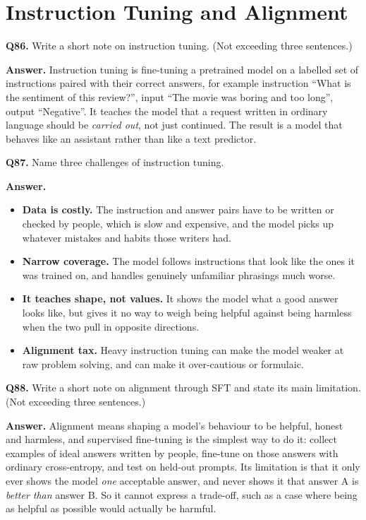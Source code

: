 \documentclass[11pt]{article}
\begin{document}
\section{Instruction Tuning and Alignment}

\textbf{Q86.} Write a short note on instruction tuning. (Not exceeding three sentences.)

\textbf{Answer.} Instruction tuning is fine-tuning a pretrained model on a labelled set of
instructions paired with their correct answers, for example instruction ``What is the
sentiment of this review?'', input ``The movie was boring and too long'', output ``Negative''.
It teaches the model that a request written in ordinary language should be \emph{carried out},
not just continued. The result is a model that behaves like an assistant rather than like a
text predictor.

\medskip
\textbf{Q87.} Name three challenges of instruction tuning.

\textbf{Answer.}
\begin{itemize}
  \item \textbf{Data is costly.} The instruction and answer pairs have to be written or checked by people, which is slow and expensive, and the model picks up whatever mistakes and habits those writers had.
  \item \textbf{Narrow coverage.} The model follows instructions that look like the ones it was trained on, and handles genuinely unfamiliar phrasings much worse.
  \item \textbf{It teaches shape, not values.} It shows the model what a good answer looks like, but gives it no way to weigh being helpful against being harmless when the two pull in opposite directions.
  \item \textbf{Alignment tax.} Heavy instruction tuning can make the model weaker at raw problem solving, and can make it over-cautious or formulaic.
\end{itemize}

\medskip
\textbf{Q88.} Write a short note on alignment through SFT and state its main limitation. (Not
exceeding three sentences.)

\textbf{Answer.} Alignment means shaping a model's behaviour to be helpful, honest and
harmless, and supervised fine-tuning is the simplest way to do it: collect examples of ideal
answers written by people, fine-tune on those answers with ordinary cross-entropy, and test on
held-out prompts. Its limitation is that it only ever shows the model \emph{one} acceptable
answer, and never shows it that answer A is \emph{better than} answer B. So it cannot express
a trade-off, such as a case where being as helpful as possible would actually be harmful.
\end{document}
